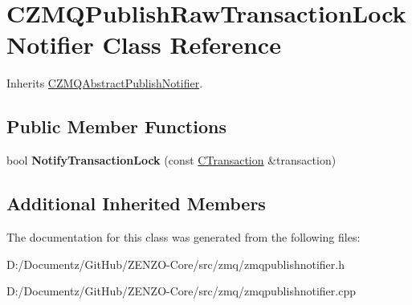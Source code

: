 \hypertarget{class_c_z_m_q_publish_raw_transaction_lock_notifier}{}\section{C\+Z\+M\+Q\+Publish\+Raw\+Transaction\+Lock\+Notifier Class Reference}
\label{class_c_z_m_q_publish_raw_transaction_lock_notifier}


Inherits \mbox{\hyperlink{class_c_z_m_q_abstract_publish_notifier}{C\+Z\+M\+Q\+Abstract\+Publish\+Notifier}}.

\subsection*{Public Member Functions}
\begin{DoxyCompactItemize}
\item 
\mbox{\label{class_c_z_m_q_publish_raw_transaction_lock_notifier_a54b6dd2bd22f859ac8eca3585d906416}} 
bool {\bfseries Notify\+Transaction\+Lock} (const \mbox{\hyperlink{class_c_transaction}{C\+Transaction}} \&transaction)
\end{DoxyCompactItemize}
\subsection*{Additional Inherited Members}


The documentation for this class was generated from the following files\+:\begin{DoxyCompactItemize}
\item 
D\+:/\+Documentz/\+Git\+Hub/\+Z\+E\+N\+Z\+O-\/\+Core/src/zmq/zmqpublishnotifier.\+h\item 
D\+:/\+Documentz/\+Git\+Hub/\+Z\+E\+N\+Z\+O-\/\+Core/src/zmq/zmqpublishnotifier.\+cpp\end{DoxyCompactItemize}
